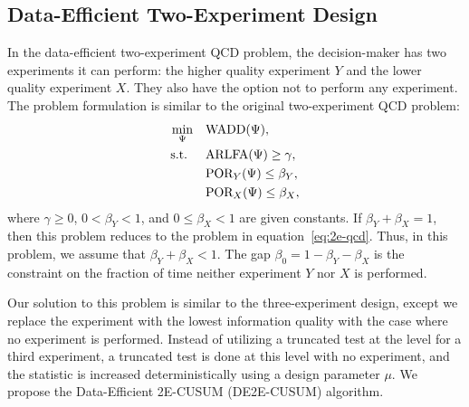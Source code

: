 \documentclass[journal, onecolumn]{IEEEtran}
\begin{document}
\subsection{Data-Efficient Two-Experiment Design}
\label{sec:de-two-expt}

In the data-efficient two-experiment QCD problem, the decision-maker has two experiments it can perform: the higher quality experiment $Y$ and the lower quality experiment $X$. They also have the option not to perform any experiment. The problem formulation is similar to the original two-experiment QCD problem: 
\begin{align}
\begin{split}
\min_{\Psi} \quad & \textup{WADD} (\Psi), \\
\text{s.t. } \quad & \textup{ARLFA} (\Psi) \geq \gamma, \\
& \textup{POR}_Y (\Psi) \leq \beta_Y, \\
& \textup{POR}_X (\Psi) \leq \beta_X,
\end{split}
\end{align}
where $\gamma \geq 0$, $0 < \beta_Y < 1$, and $0 \leq \beta_X < 1$ are given constants. If $\beta_Y + \beta_X=1$, then this problem reduces to the problem in equation~\eqref{eq:2e-qcd}. Thus, in this problem, we assume that $\beta_Y + \beta_X < 1$. The gap $\beta_0 = 1 - \beta_Y - \beta_X$ is the constraint on the fraction of time neither experiment $Y$ nor $X$ is performed. 

Our solution to this problem is similar to the three-experiment design, except we replace the experiment with the lowest information quality with the case where no experiment is performed. Instead of utilizing a truncated test at the level for a third experiment, a truncated test is done at this level with no experiment, and the statistic is increased deterministically using a design parameter $\mu$. 
We propose the Data-Efficient 2E-CUSUM (DE2E-CUSUM) algorithm.
\end{document}
